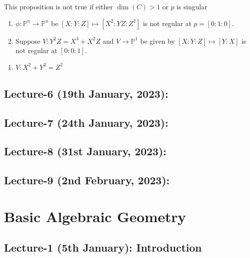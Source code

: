 \documentclass[oneside, 12pt, ]{scrbook}
\newcommand{\PP}{\mathbb{P}}
\theoremstyle{theorem}
\begin{document}
\begin{remark}
This proposition is not true if either $\dim(C) > 1$ or $p$ is singular 
\begin{enumerate}
\item $\phi: \PP^n \rightarrow \PP^n$ be $[X:Y:Z] \mapsto [X^2 : YZ : Z^2]$ is not regular at $p = [0:1:0]$.
\item Suppose $V : Y^2 Z = X^3 + X^2 Z$ and $V \rightarrow \PP^1$ be given by $[X:Y:Z] \mapsto [Y:X]$ is not regular at $[0:0:1]$.
\end{enumerate}
\end{remark}

\begin{example}
\begin{enumerate}
\item $V: X^2 + Y^2 = Z^2$
\end{enumerate}
\end{example}


\chapter{Lecture-6 (19th January, 2023):}


\chapter{Lecture-7 (24th January, 2023):}

\chapter{Lecture-8 (31st January, 2023): }

\chapter{Lecture-9 (2nd February, 2023): }



















\part{Basic Algebraic Geometry}

\chapter{Lecture-1 (5th January): Introduction}
\end{document}
